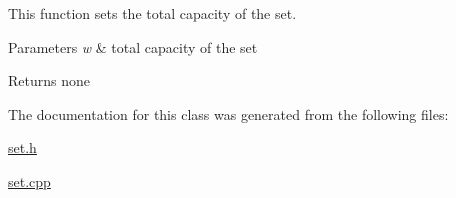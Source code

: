 This function sets the total capacity of the set.


\begin{DoxyParams}{Parameters}
{\em w} & total capacity of the set \\
\hline
\end{DoxyParams}
\begin{DoxyReturn}{Returns}
none 
\end{DoxyReturn}


The documentation for this class was generated from the following files\+:\begin{DoxyCompactItemize}
\item 
\hyperlink{set_8h}{set.\+h}\item 
\hyperlink{set_8cpp}{set.\+cpp}\end{DoxyCompactItemize}
